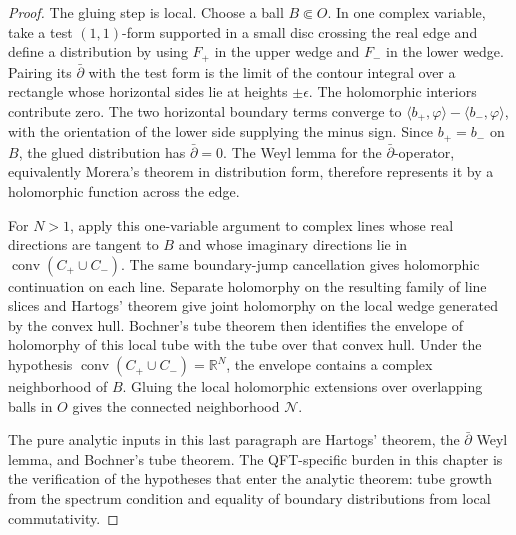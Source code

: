 \begin{proof}
The gluing step is local.  Choose a ball \(B\Subset O\).  In one complex
variable, take a test \((1,1)\)-form supported in a small disc crossing the
real edge and define a distribution by using \(F_+\) in the upper wedge and
\(F_-\) in the lower wedge.  Pairing its \(\bar\partial\) with the test form is
the limit of the contour integral over a rectangle whose horizontal sides lie
at heights \(\pm\epsilon\).  The holomorphic interiors contribute zero.  The
two horizontal boundary terms converge to
\(\langle b_+,\varphi\rangle-\langle b_-,\varphi\rangle\), with the orientation
of the lower side supplying the minus sign.  Since \(b_+=b_-\) on \(B\), the
glued distribution has \(\bar\partial=0\).  The Weyl lemma for the
\(\bar\partial\)-operator, equivalently Morera's theorem in distribution form,
therefore represents it by a holomorphic function across the edge.

For \(N>1\), apply this one-variable argument to complex lines whose real
directions are tangent to \(B\) and whose imaginary directions lie in
\(\operatorname{conv}(C_+\cup C_-)\).  The same boundary-jump cancellation
gives holomorphic continuation on each line.  Separate holomorphy on the
resulting family of line slices and Hartogs' theorem give joint holomorphy on
the local wedge generated by the convex hull.  Bochner's tube theorem then
identifies the envelope of holomorphy of this local tube with the tube over
that convex hull.  Under the hypothesis
\(\operatorname{conv}(C_+\cup C_-)=\mathbb R^N\), the envelope contains a
complex neighborhood of \(B\).  Gluing the local holomorphic extensions over
overlapping balls in \(O\) gives the connected neighborhood \(\mathcal N\).

The pure analytic inputs in this last paragraph are Hartogs' theorem, the
\(\bar\partial\) Weyl lemma, and Bochner's tube theorem.  The QFT-specific
burden in this chapter is the verification of the hypotheses that enter the
analytic theorem: tube growth from the spectrum condition and equality of
boundary distributions from local commutativity.
\end{proof}

